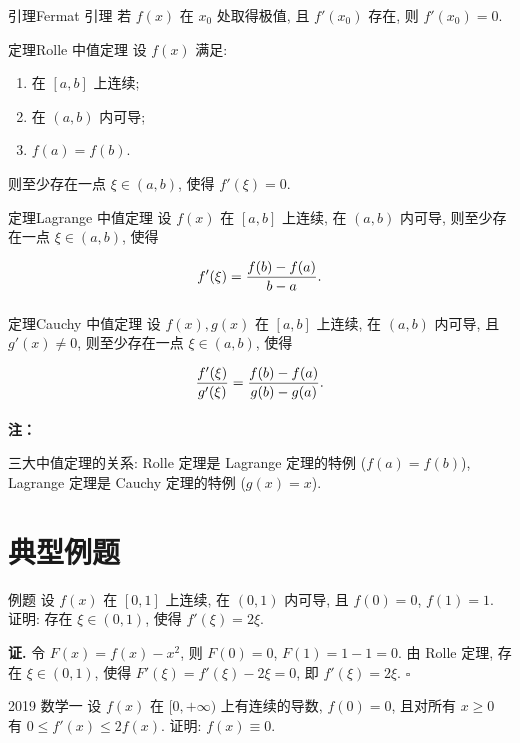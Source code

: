 \documentclass[a4paper,12pt,oneside,fontset=none]{ctexbook}
\renewcommand{\ge}{\geqslant}
\renewcommand{\le}{\leqslant}
\let\olddfrac\dfrac
\renewcommand{\dfrac}[2]{
	\olddfrac{#1\vrule width 0pt height 1.15em depth 0em}{#2\vrule width 0pt height 0em depth 0.6em}
}
\newcounter{theorem}[chapter]
\newenvironment{theorem}[1][]{\begin{thmBox}{定理}{#1}}{\end{thmBox}}
\newenvironment{lemma}[1][]{\begin{thmBox}{引理}{#1}}{\end{thmBox}}
\newcounter{example}[chapter]
\newenvironment{example}[1][]{\begin{exBox}{例题}{#1}}{\end{exBox}}
\newenvironment{realexam}[1][]
{%
	\begin{realexamBox}{#1}}{\end{realexamBox}
}
\newenvironment{note}{
	\par\vspace{0.5em}\noindent
	\textbf{\color{NoteColor} 注：}
}{
	\par\vspace{0.5em}
}
\numberwithin{equation}{chapter}
\begin{document}
	\begin{lemma}[Fermat 引理]
		若 $f(x)$ 在 $x_0$ 处取得极值, 且 $f'(x_0)$ 存在, 则 $f'(x_0) = 0$.
	\end{lemma}
	
	\begin{theorem}[Rolle 中值定理]
		设 $f(x)$ 满足:
		\begin{enumerate}
			\item 在 $[a, b]$ 上连续;
			\item 在 $(a, b)$ 内可导;
			\item $f(a) = f(b)$.
		\end{enumerate}
		则至少存在一点 $\xi \in (a, b)$, 使得 $f'(\xi) = 0$.
	\end{theorem}
	
	\begin{theorem}[Lagrange 中值定理]
		设 $f(x)$ 在 $[a, b]$ 上连续, 在 $(a, b)$ 内可导, 则至少存在一点 $\xi \in (a, b)$, 使得
		\[
		f'(\xi) = \dfrac{f(b) - f(a)}{b - a}.
		\]
	\end{theorem}
	
	\begin{theorem}[Cauchy 中值定理]
		设 $f(x), g(x)$ 在 $[a, b]$ 上连续, 在 $(a, b)$ 内可导, 且 $g'(x) \neq 0$, 则至少存在一点 $\xi \in (a, b)$, 使得
		\[
		\dfrac{f'(\xi)}{g'(\xi)} = \dfrac{f(b) - f(a)}{g(b) - g(a)}.
		\]
	\end{theorem}
	
	\begin{note}
		三大中值定理的关系: Rolle 定理是 Lagrange 定理的特例 ($f(a) = f(b)$), Lagrange 定理是 Cauchy 定理的特例 ($g(x) = x$).
	\end{note}
	
	\section{典型例题}
	
	\begin{example}
		设 $f(x)$ 在 $[0, 1]$ 上连续, 在 $(0, 1)$ 内可导, 且 $f(0) = 0$, $f(1) = 1$. 证明: 存在 $\xi \in (0, 1)$, 使得 $f'(\xi) = 2\xi$.
	\end{example}
	
	\textbf{证.} 令 $F(x) = f(x) - x^2$, 则 $F(0) = 0$, $F(1) = 1 - 1 = 0$. 由 Rolle 定理, 存在 $\xi \in (0, 1)$, 使得 $F'(\xi) = f'(\xi) - 2\xi = 0$, 即 $f'(\xi) = 2\xi$. \hfill $\square$
	
	\begin{realexam}[2019 数学一]
		设 $f(x)$ 在 $[0, +\infty)$ 上有连续的导数, $f(0) = 0$, 且对所有 $x \ge 0$ 有 $0 \le f'(x) \le 2f(x)$. 证明: $f(x) \equiv 0$.
	\end{realexam}
	
\end{document}
